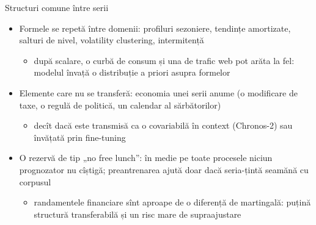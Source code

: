 \begin{frame}{Structuri comune între serii}
\itemsize{\small}
\begin{itemize}
    \item Formele se repetă între domenii: profiluri sezoniere, tendințe amortizate, salturi de nivel, volatility clustering, intermitență
    \begin{itemize}
        \item după scalare, o curbă de consum și una de trafic web pot arăta la fel: modelul învață o distribuție a priori asupra formelor
    \end{itemize}
    \item Elemente care nu se transferă: economia unei serii anume (o modificare de taxe, o regulă de politică, un calendar al sărbătorilor)
    \begin{itemize}
        \item decît dacă este transmisă ca o covariabilă în context (Chronos-2) sau învățată prin fine-tuning
    \end{itemize}
    \item O rezervă de tip „no free lunch”: în medie pe toate procesele niciun prognozator nu cîștigă; preantrenarea ajută doar dacă seria-țintă seamănă cu corpusul
    \begin{itemize}
        \item randamentele financiare sînt aproape de o diferență de martingală: puțină structură transferabilă și un risc mare de supraajustare
    \end{itemize}
\end{itemize}
\end{frame}

